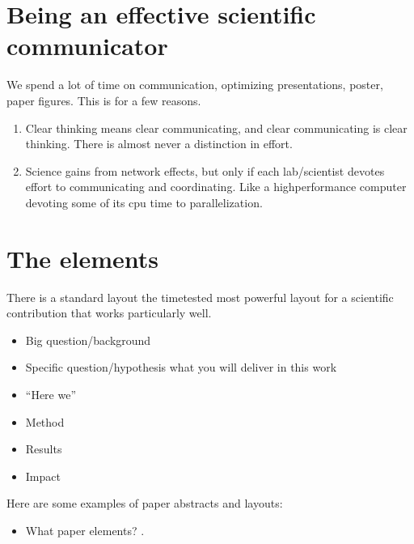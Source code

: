 \documentclass[letterpaper,10pt,english]{sphinxmanual}
\begin{document}
\section{Being an effective scientific communicator}
\label{\detokenize{02Elements:being-an-effective-scientific-communicator}}
\sphinxAtStartPar
We spend a lot of time on communication, optimizing presentations, poster, paper figures. This is for a few reasons.
\begin{enumerate}
%
\item {} 
\sphinxAtStartPar
Clear thinking means clear communicating, and clear communicating is clear thinking. There is almost never a distinction in effort.

\item {} 
\sphinxAtStartPar
Science gains from network effects, but only if each lab/scientist devotes effort to communicating and coordinating. Like a high\sphinxhyphen{}performance computer devoting some of its cpu time to parallelization.

\end{enumerate}


\section{The elements}
\label{\detokenize{02Elements:the-elements}}
\sphinxAtStartPar
There is a standard layout \textendash{} the time\sphinxhyphen{}tested most powerful layout \textendash{} for a  scientific contribution that works particularly well.
\begin{itemize}
\item {} 
\sphinxAtStartPar
Big question/background

\item {} 
\sphinxAtStartPar
Specific question/hypothesis \textendash{} what you will deliver in this work

\item {} 
\sphinxAtStartPar
“Here we”

\item {} 
\sphinxAtStartPar
Method

\item {} 
\sphinxAtStartPar
Results

\item {} 
\sphinxAtStartPar
Impact

\end{itemize}

\sphinxAtStartPar
Here are some examples of paper abstracts and layouts:
\begin{itemize}
\item {} 
\sphinxAtStartPar
What paper elements? .

\end{itemize}
\end{document}
